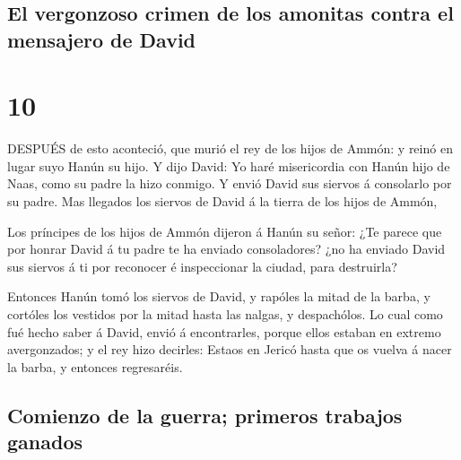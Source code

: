 \hypertarget{el-vergonzoso-crimen-de-los-amonitas-contra-el-mensajero-de-david}{%
\subsection{El vergonzoso crimen de los amonitas contra el mensajero de
David}\label{el-vergonzoso-crimen-de-los-amonitas-contra-el-mensajero-de-david}}

\hypertarget{section-9}{%
\section{10}\label{section-9}}

 DESPUÉS de esto aconteció, que murió el rey de los hijos de
Ammón: y reinó en lugar suyo Hanún su hijo.  Y dijo David:
Yo haré misericordia con Hanún hijo de Naas, como su padre la hizo
conmigo. Y envió David sus siervos á consolarlo por su padre. Mas
llegados los siervos de David á la tierra de los hijos de Ammón,

 Los príncipes de los hijos de Ammón dijeron á Hanún su
señor: ¿Te parece que por honrar David á tu padre te ha enviado
consoladores? ¿no ha enviado David sus siervos á ti por reconocer é
inspeccionar la ciudad, para destruirla?

 Entonces Hanún tomó los siervos de David, y rapóles la
mitad de la barba, y cortóles los vestidos por la mitad hasta las
nalgas, y despachólos.  Lo cual como fué hecho saber á
David, envió á encontrarles, porque ellos estaban en extremo
avergonzados; y el rey hizo decirles: Estaos en Jericó hasta que os
vuelva á nacer la barba, y entonces regresaréis.

\hypertarget{comienzo-de-la-guerra-primeros-trabajos-ganados}{%
\subsection{Comienzo de la guerra; primeros trabajos
ganados}\label{comienzo-de-la-guerra-primeros-trabajos-ganados}}

